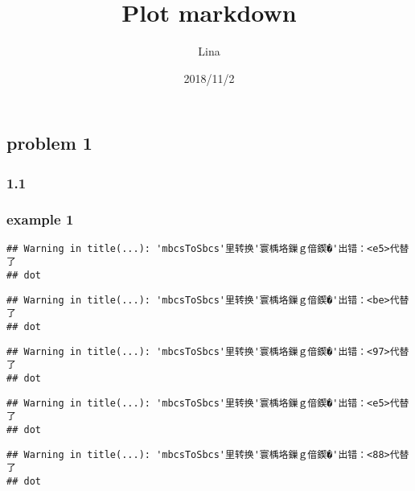 \documentclass[]{article}
\title{Plot markdown}
\author{Lina}
\date{2018/11/2}
\newenvironment{Shaded}{\begin{snugshade}}{\end{snugshade}}
\newcommand{\KeywordTok}[1]{\textcolor[rgb]{0.13,0.29,0.53}{\textbf{#1}}}
\newcommand{\DataTypeTok}[1]{\textcolor[rgb]{0.13,0.29,0.53}{#1}}
\newcommand{\StringTok}[1]{\textcolor[rgb]{0.31,0.60,0.02}{#1}}
\newcommand{\OperatorTok}[1]{\textcolor[rgb]{0.81,0.36,0.00}{\textbf{#1}}}
\newcommand{\NormalTok}[1]{#1}
\begin{document}
\maketitle

\subsection{problem 1}\label{problem-1}

\subsubsection{1.1}\label{section}

\subsubsection{example 1}\label{example-1}

\begin{Shaded}
\end{Shaded}

\begin{verbatim}
## Warning in title(...): 'mbcsToSbcs'里转换'寰楀垎鏁ｇ偣鍥�'出错：<e5>代替了
## dot
\end{verbatim}

\begin{verbatim}
## Warning in title(...): 'mbcsToSbcs'里转换'寰楀垎鏁ｇ偣鍥�'出错：<be>代替了
## dot
\end{verbatim}

\begin{verbatim}
## Warning in title(...): 'mbcsToSbcs'里转换'寰楀垎鏁ｇ偣鍥�'出错：<97>代替了
## dot
\end{verbatim}

\begin{verbatim}
## Warning in title(...): 'mbcsToSbcs'里转换'寰楀垎鏁ｇ偣鍥�'出错：<e5>代替了
## dot
\end{verbatim}

\begin{verbatim}
## Warning in title(...): 'mbcsToSbcs'里转换'寰楀垎鏁ｇ偣鍥�'出错：<88>代替了
## dot
\end{verbatim}
\end{document}
